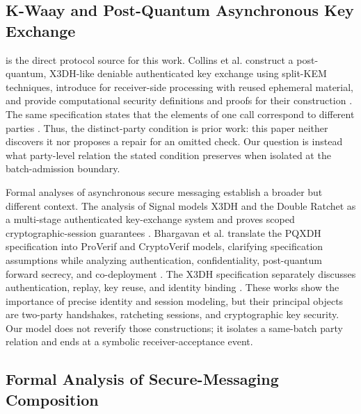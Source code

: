 
\subsection{K-Waay and Post-Quantum Asynchronous Key Exchange}

\kwaay is the direct protocol source for this work. Collins et al. construct a
post-quantum, X3DH-like deniable authenticated key exchange using split-KEM
techniques, introduce \batchreceive for receiver-side processing with reused
ephemeral material, and provide computational security definitions and proofs
for their construction \cite{collins2024kwaay}. The same specification states
that the elements of one \batchreceive call correspond to different parties
\cite[Sec.~5.1]{collins2024kwaay}. Thus, the distinct-party condition is prior
work: this paper neither discovers it nor proposes a repair for an omitted
check. Our question is instead what party-level relation the stated condition
preserves when isolated at the batch-admission boundary.

Formal analyses of asynchronous secure messaging establish a broader but
different context. The analysis of Signal models X3DH and the Double Ratchet
as a multi-stage authenticated key-exchange system and proves scoped
cryptographic-session guarantees \cite{cohngordon2020signal}. Bhargavan et al.
translate the PQXDH specification into ProVerif and CryptoVerif models,
clarifying specification assumptions while analyzing authentication,
confidentiality, post-quantum forward secrecy, and co-deployment
\cite{bhargavan2024pqxdh}. The X3DH specification separately discusses
authentication, replay, key reuse, and identity binding
\cite{marlinspike2016x3dh}. These works show the importance of precise
identity and session modeling, but their principal objects are two-party
handshakes, ratcheting sessions, and cryptographic key security. Our model does
not reverify those constructions; it isolates a same-batch party relation and
ends at a symbolic receiver-acceptance event.

\subsection{Formal Analysis of Secure-Messaging Composition}


